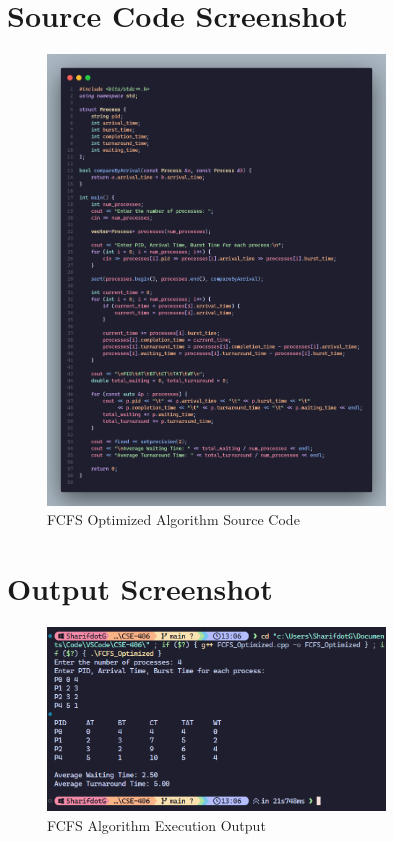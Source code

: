 \documentclass[12pt,a4paper]{article}
\begin{document}
\section{Source Code Screenshot}
\begin{figure}[H]
    \centering
    \includegraphics[width=0.8\textwidth]{code.png}
    \caption{FCFS Optimized Algorithm Source Code}
    \label{fig:fcfs_source}
\end{figure}

\section{Output Screenshot}
\begin{figure}[H]
    \centering
    \includegraphics[width=0.8\textwidth]{Screenshot 2025-07-23 130728.png}
    \caption{FCFS Algorithm Execution Output}
    \label{fig:fcfs_output}
\end{figure}
\end{document}
